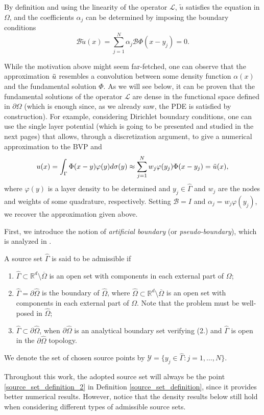 By definition and using the linearity of the operator \(\mathcal{L}\), \(\tilde{u}\) satisfies the equation in \(\Omega\), and the coefficients \(\alpha_j\) can be determined by imposing the boundary conditions
\[
    \mathcal{B}\tilde{u}(x)=\sum_{j=1}^{N}\alpha_j \mathcal{B}\Phi(x-y_j)=0.
\]
\begin{remark}
    While the motivation above might seem far-fetched, one can observe that the approximation \(\Tilde{u}\) resembles a convolution between some density function \(\alpha(x)\) and the fundamental solution \(\Phi\). As we will see below, it can be proven that the fundamental solutions of the operator \(\mathcal{L}\) are dense in the functional space defined in \(\partial\Omega\) (which is enough since, as we already saw, the \ac{PDE} is satisfied by construction). For example, considering Dirichlet boundary conditions, one can use the single layer potential (which is going to be presented and studied in the next pages) that allows, through a discretization argument, to give a numerical approximation to the \ac{BVP} and
    \begin{equation}\label{MFS_approx_disc}
        u(x) = \int_{\Gamma}\Phi(x-y)\varphi(y)d\sigma(y) \approx \sum_{j=1}^{N}w_j \varphi(y_j) \Phi(x-y_j) = \Tilde{u}(x), 
    \end{equation}
    where \(\varphi(y)\) is a layer density to be determined and \(y_j \in \hat{\Gamma}\) and \(w_j\) are the nodes and weights of some quadrature, respectively. Setting \(\mathcal{B} = I\) and \(\alpha_j = w_j \varphi(y_j)\), we recover the approximation given above.
\end{remark}
First, we introduce the notion of \textit{artificial boundary} (or \textit{pseudo-boundary}), which is analyzed in \cite{alves2009choice}.
\begin{definition}\label{source_set_definition}
    A source set \(\hat{\Gamma}\) is said to be admissible if
    \begin{enumerate}
        \item \(\hat{\Gamma} \subset \mathbb{R}^d\setminus \overline{\Omega}\) is an open set with components in each external part of \(\Omega\);
        \item \label{source_set_definition_2} \(\hat{\Gamma} = \partial \hat{\Omega}\) is the boundary of \(\hat{\Omega}\), where \(\hat{\Omega} \subset \mathbb{R}^d\setminus\overline{\Omega}\) is an open set with components in each external part of \(\Omega\). Note that the problem must be well-posed in \(\hat{\Omega}\);
        \item \(\hat{\Gamma} \subset \partial \hat{\Omega}\), when \(\partial \hat{\Omega}\) is an analytical boundary set verifying (2.) and \(\hat{\Gamma}\) is open in the \(\partial \hat{\Omega}\) topology. 
    \end{enumerate}
    We denote the set of chosen source points by \(\mathcal{Y} = \{y_j \in \hat{\Gamma}: j=1,\dots,N\}\).
\end{definition}
Throughout this work, the adopted source set will always be the point \ref{source_set_definition_2} in Definition \ref{source_set_definition}, since it provides better numerical results. However, notice that the density results below still hold when considering different types of admissible source sets.


